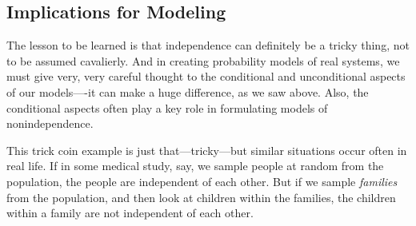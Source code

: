 \subsection{Implications for Modeling}

The lesson to be learned is that independence can definitely be a tricky
thing, not to be assumed cavalierly.   And in creating probability
models of real systems, we must give very, very careful thought to the
conditional and unconditional aspects of our models----it can make a
huge difference, as we saw above.  Also, the conditional aspects often
play a key role in formulating models of nonindependence. 

This trick coin example is just that---tricky---but similar situations
occur often in real life.  If in some medical study, say, we sample
people at random from the population, the people are independent of each
other.  But if we sample {\it families} from the population, and then
look at children within the families, the children within a family are
not independent of each other.

